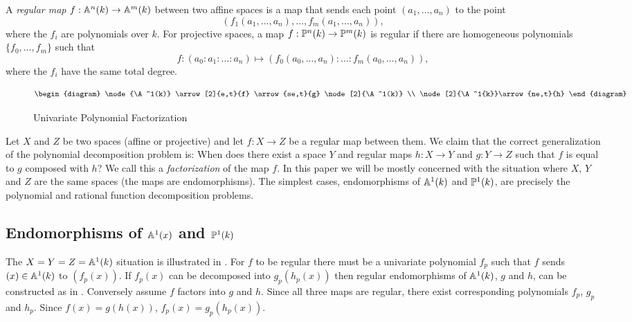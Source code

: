 A {\em regular map} $f: \A^n(k) \rightarrow \A^m(k)$ between two
affine spaces is a map that sends each point $(a_1, \ldots, a_n)$
to the point
\[
(f_1(a_1, \ldots, a_n), \ldots, f_m(a_1, \ldots, a_n)),
\]
where the $f_i$ are polynomials over $k$.  For projective spaces, a
map $f: \P^n(k) \rightarrow \P^m(k)$ is regular if
there are homogeneous polynomials $\{f_0, \ldots, f_m\}$ such that
\[
f : (a_0: a_1: \ldots: a_n) \mapsto 
   (f_0(a_0, \ldots, a_n): \ldots: f_m(a_0, \ldots, a_n)), 
\]
where the $f_i$ have the same total degree.

\begin{figure}
\[
\begin{diagram}
\node{\A^1(k)} \arrow[2]{e,t}{f} \arrow{se,t}{g} \node[2]{\A^1(k)} \\
\node[2]{\A^1{k}}\arrow{ne,t}{h} 
\end{diagram}
\]
\caption{Univariate Polynomial Factorization \label{Polynomial:Factor:Fig}}
\end{figure}

Let $X$ and $Z$ be two spaces (affine or projective) and let
$f:X\rightarrow Z$ be a regular map between them.  We claim that
the correct generalization of the polynomial decomposition problem is:
When does there exist a space $Y$ and regular maps $h:X\rightarrow
Y$ and $g:Y\rightarrow Z$ such that $f$ is equal to $g$ composed
with $h$?  We call this a {\em factorization} of the map $f$.  In this
paper we will be mostly concerned with the situation where $X$, $Y$
and $Z$ are the same spaces (the maps are endomorphisms).  The
simplest cases, endomorphisms of $\A^1(k)$ and $\P^1(k)$, are
precisely the polynomial and rational function decomposition problems.

\subsection{Endomorphisms of $\A^1(x)$ and $\P^1(k)$}
\label{Endo:A1:Sec}

The $X=Y=Z=\A^1(k)$ situation is illustrated in
.  For
$f$ to be regular there must be a univariate polynomial $f_p$ such
that $f$ sends $(x) \in \A^1(k)$ to $(f_p(x))$.  If $f_p(x)$ can be
decomposed into $g_p(h_p(x))$ then regular endomorphisms of $\A^1(k)$,
$g$ and $h$, can be constructed as in .
Conversely assume $f$ factors into $g$ and $h$.  Since all three maps
are regular, there exist corresponding polynomials $f_p$, $g_p$ and
$h_p$.  Since $f(x) = g(h(x))$, $f_p(x) = g_p(h_p(x))$.  

